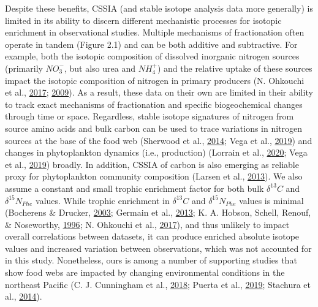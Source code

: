 \documentclass [11pt, proquest] {uwthesis}[2015/03/03]
\begin{document}
Despite these benefits, CSSIA (and stable isotope analysis data more
generally) is limited in its ability to discern different mechanistic
processes for isotopic enrichment in observational studies. Multiple
mechanisms of fractionation often operate in tandem (Figure 2.1) and can
be both additive and subtractive. For example, both the isotopic
composition of dissolved inorganic nitrogen sources (primarily
\(NO_3^-\), but also urea and \(NH_4^+\)) and the relative uptake of
these sources impact the isotopic composition of nitrogen in primary
producers (N. Ohkouchi et al.,
\protect\hyperlink{ref-Ohkouchi2017}{2017};
\protect\hyperlink{ref-Graham2010}{2009}). As a result, these data on
their own are limited in their ability to track exact mechanisms of
fractionation and specific biogeochemical changes through time or space.
Regardless, stable isotope signatures of nitrogen from source amino
acids and bulk carbon can be used to trace variations in nitrogen
sources at the base of the food web (Sherwood et al.,
\protect\hyperlink{ref-Sherwood2014}{2014}; Vega et al.,
\protect\hyperlink{ref-delaVega2019}{2019}) and changes in phytoplankton
dynamics (i.e., production) (Lorrain et al.,
\protect\hyperlink{ref-Lorrain2020}{2020}; Vega et al.,
\protect\hyperlink{ref-delaVega2019}{2019}) broadly. In addition, CSSIA
of carbon is also emerging as reliable proxy for phytoplankton community
composition (Larsen et al., \protect\hyperlink{ref-Larsen2013}{2013}).
We also assume a constant and small trophic enrichment factor for both
bulk \(\delta^{13}C\) and \(\delta^{15}N_{Phe}\) values. While trophic
enrichment in \(\delta^{13}C\) and \(\delta^{15}N_{Phe}\) values is
minimal (Bocherens \& Drucker,
\protect\hyperlink{ref-Bocherens2003}{2003}; Germain et al.,
\protect\hyperlink{ref-Germain2013}{2013}; K. A. Hobson, Schell, Renouf,
\& Noseworthy, \protect\hyperlink{ref-Hobson1996}{1996}; N. Ohkouchi et
al., \protect\hyperlink{ref-Ohkouchi2017}{2017}), and thus unlikely to
impact overall correlations between datasets, it can produce enriched
absolute isotope values and increased variation between observations,
which was not accounted for in this study. Nonetheless, ours is among a
number of supporting studies that show food webs are impacted by
changing environmental conditions in the northeast Pacific (C. J.
Cunningham et al., \protect\hyperlink{ref-Cunningham2018}{2018}; Puerta
et al., \protect\hyperlink{ref-Puerta2019}{2019}; Stachura et al.,
\protect\hyperlink{ref-Stachura2014}{2014}).
\end{document}
